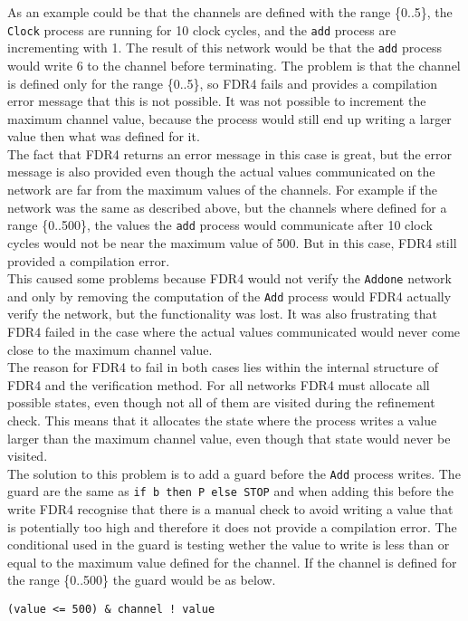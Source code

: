 As an example could be that the channels are defined with the range \{0..5\}, the \texttt{Clock} process are running for 10 clock cycles, and the \texttt{add} process are incrementing with 1.
The result of this network would be that the \texttt{add} process would write 6 to the channel before terminating. The problem is that the channel is defined only for the range \{0..5\}, so FDR4 fails and provides a compilation error message that this is not possible. It was not possible to increment the maximum channel value, because the process would still end up writing a larger value then what was defined for it.\\

The fact that FDR4 returns an error message in this case is great, but the error message is also provided even though the actual values communicated on the network are far from the maximum values of the channels. For example if the network was the same as described above, but the channels where defined for a range \{0..500\}, the values the \texttt{add} process would communicate after 10 clock cycles would not be near the maximum value of 500. But in this case, FDR4 still provided a compilation error. \\

This caused some problems because FDR4 would not verify the \texttt{Addone} network and only by removing the computation of the \texttt{Add} process would FDR4 actually verify the network, but the functionality was lost.
It was also frustrating that FDR4 failed in the case where the actual values communicated would never come close to the maximum channel value.\\

The reason for FDR4 to fail in both cases lies within the internal structure of FDR4 and the verification method. For all networks FDR4 must allocate all possible states, even though not all of them are visited during the refinement check. This means that it allocates the state where the process writes a value larger than the maximum channel value, even though that state would never be visited.\\

The solution to this problem is to add a guard before the \texttt{Add} process writes. The \cspm{} guard are the same as \texttt{if b then P else STOP} and when adding this before the write FDR4 recognise that there is a manual check to avoid writing a value that is potentially too high and therefore it does not provide a compilation error. The conditional used in the guard is testing wether the value to write is less than or equal to the maximum value defined for the channel. If the channel is defined for the range \{0..500\} the guard would be as below.
\begin{verbatim}
(value <= 500) & channel ! value
\end{verbatim}

